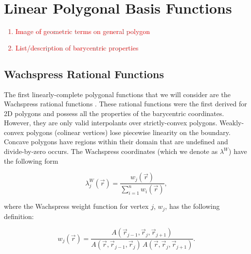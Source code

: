 \documentclass[preprint,10pt]{elsarticle}
\newcommand{\tcr}[1]{\textcolor{red}{#1}}
\begin{document}
\section{Linear Polygonal Basis Functions} \label{sec::linpoly}
\tcr
{
\begin{enumerate}
\item Image of geometric terms on general polygon
\item List/description of barycentric properties
\end{enumerate}
}

\subsection{Wachspress Rational Functions}

The first linearly-complete polygonal functions that we will consider are the Wachspress rational functions \cite{wachspress1975rational}. These rational functions were the first derived for 2D polygons and possess all the properties of the barycentric coordinates. However, they are only valid interpolants over strictly-convex polygons. Weakly-convex polygons (colinear vertices) lose piecewise linearity on the boundary. Concave polygons have regions within their domain that are undefined and divide-by-zero occurs. The Wachspress coordinates (which we denote as $\lambda^W$) have the following form

\begin{equation}
\label{eq::wach_BF}
\lambda_{j}^{W} (\vec{r}) = \frac{w_j (\vec{r}) }{\sum\limits_{i=1}^{n} w_i (\vec{r})},
\end{equation}

\noindent where the Wachspress weight function for vertex $j$, $w_j$, has the following definition:

\begin{equation}
\label{eq::wach_weights}
w_j (\vec{r})  = \frac{A(\vec{r}_{j-1}, \vec{r}_{j}, \vec{r}_{j+1})}{A(\vec{r}, \vec{r}_{j-1}, \vec{r}_{j}) \, A(\vec{r}, \vec{r}_{j}, \vec{r}_{j+1})} .
\end{equation}
\end{document}
